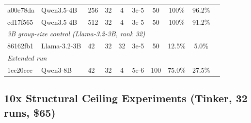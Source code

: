 \documentclass{article}
\begin{document}
\begin{table}[htbp]
\begin{tabular}{lllccccccc}
        a00e78da & Qwen3.5-4B & 256 & 32 & 4 & 3e-5 & 50 & 100\% & 96.2\% \\
        cd17f565 & Qwen3.5-4B & 512 & 32 & 4 & 3e-5 & 50 & 100\% & 91.2\% \\
        \midrule
        \multicolumn{9}{l}{\emph{3B group-size control (Llama-3.2-3B, rank 32)}} \\
        86162fb1 & Llama-3.2-3B & 42 & 32 & 32 & 3e-5 & 50 & 12.5\% & 5.0\% \\
        \midrule
        \multicolumn{9}{l}{\emph{Extended run}} \\
        1cc20cec & Qwen3-8B & 42 & 32 & 4 & 5e-6 & 100 & 75.0\% & 27.5\% \\
        \bottomrule
    \end{tabular}
    \label{tab:gsm8k_runs}
\end{table}

\subsection{10x Structural Ceiling Experiments (Tinker, 32 runs, \$65)}
\end{document}
